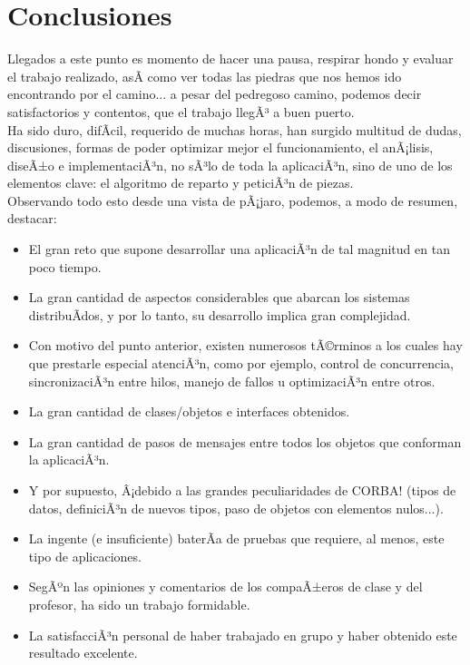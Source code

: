 \chapter{Conclusiones}
Llegados a este punto es momento de hacer una pausa, respirar hondo y evaluar el trabajo realizado, asÃ­ como ver todas las piedras que nos hemos ido
encontrando por el camino... a pesar del pedregoso camino, podemos decir satisfactorios y contentos, que el trabajo llegÃ³ a buen puerto.\\

Ha sido duro, difÃ­cil, requerido de muchas horas, han surgido multitud de dudas, discusiones, formas de poder optimizar mejor el funcionamiento, el
anÃ¡lisis, diseÃ±o e implementaciÃ³n, no sÃ³lo de toda la aplicaciÃ³n, sino de uno de los elementos clave: el algoritmo de reparto y peticiÃ³n de piezas.\\

Observando todo esto desde una vista de pÃ¡jaro, podemos, a modo de resumen, destacar:
\begin{itemize}
   \item El gran reto que supone desarrollar una aplicaciÃ³n de tal magnitud en tan poco tiempo.
   \item La gran cantidad de aspectos considerables que abarcan los sistemas distribuÃ­dos, y por lo tanto, su desarrollo implica gran complejidad.
   \item Con motivo del punto anterior, existen numerosos tÃ©rminos a los cuales hay que prestarle especial atenciÃ³n, como por ejemplo, control de
         concurrencia, sincronizaciÃ³n entre hilos, manejo de fallos u optimizaciÃ³n entre otros.
   \item La gran cantidad de clases/objetos e interfaces obtenidos.
   \item La gran cantidad de pasos de mensajes entre todos los objetos que conforman la aplicaciÃ³n.
   \item Y por supuesto, Â¡debido a las grandes peculiaridades de CORBA! (tipos de datos, definiciÃ³n de nuevos tipos, paso de objetos con elementos 
         nulos...).
   \item La ingente (e insuficiente) baterÃ­a de pruebas que requiere, al menos, este tipo de aplicaciones.
   \item SegÃºn las opiniones y comentarios de los compaÃ±eros de clase y del profesor, ha sido un trabajo formidable.
   \item La satisfacciÃ³n personal de haber trabajado en grupo y haber obtenido este resultado excelente.\\
\end{itemize}

